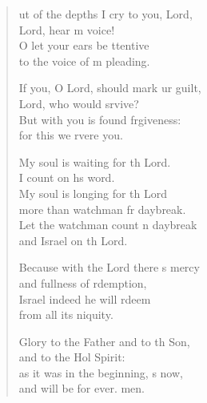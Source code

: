 \begin{verse}
  \begin{patverse}
ut of the depths I cry to you,  Lord,\Med\\
    Lord, hear m voice!\\
O let your ears be ttentive\Med\\
    to the voice of m pleading.

If you, O Lord, should mark ur guilt,\Med\\
    Lord, who would srvive?\\
But with you is found frgiveness:\Med\\
    for this we rvere you.

My soul is waiting for th Lord.\Med\\
    I count on h\pointup{\i}s word.\\
My soul is longing for th Lord\Med\\
    more than watchman fr daybreak.\\
Let the watchman count n daybreak\Med\\
    and Israel on th Lord.

Because with the Lord there \pointup{\i}s mercy\Med\\
    and fullness of rdemption,\\
Israel indeed he will rdeem\Med\\
    from all its \pointup{\i}niquity.

Glory to the Father and to th Son,\Med\\
    and to the Hol Spirit:\\
as it was in the beginning, \pointup{\i}s now,\Med\\
    and will be for ever. men.
  \end{patverse}
\end{verse}
